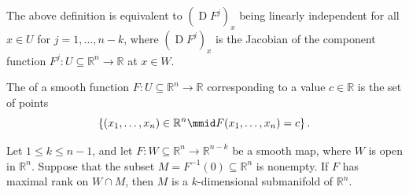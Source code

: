 \documentclass[notoc,notitlepage]{tufte-book}
\DeclareMathOperator{\D}{D}
\begin{document}
\begin{note}
  The above definition is equivalent to $(\D F^j)_x$ being linearly independent
  for all $x \in U$ for $j = 1, \ldots, n - k$, where $(\D F^j)_x$ is the
  Jacobian of the component function $F^j : U \subseteq \mathbb{R}^n \to
  \mathbb{R}$ at $x \in W$.
\end{note}

\begin{defn}\label{defn:level_set}
  The  of a smooth function $F : U \subseteq \mathbb{R}^n \to
  \mathbb{R}$  corresponding to a value
  $c \in \mathbb{R}$ is the set of points \cite{weisstein-mathworld}
  \begin{equation*}
    \left\{ (x_1, \ldots, x_n) \in \mathbb{R}^n \mmid F(x_1, \ldots, x_n) = c
    \right\}.
  \end{equation*}
\end{defn}

\begin{thm}\label{thm:implicit_submanifold_theorem}
  Let $1 \leq k \leq n - 1$, and let $F : W \subseteq \mathbb{R}^n \to
  \mathbb{R}^{n - k}$ be a smooth map, where $W$ is open in $\mathbb{R}^n$.
  Suppose that the subset $M = F^{-1}(0) \subseteq \mathbb{R}^n$ is nonempty. If
  $F$ has maximal rank on $W \cap M$, then $M$ is a $k$-dimensional submanifold
  of $\mathbb{R}^n$.
\end{thm}
\end{document}
